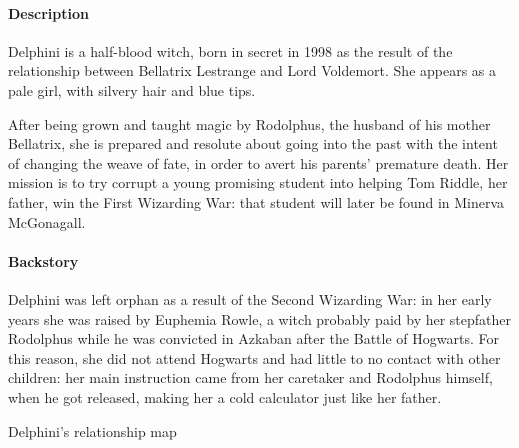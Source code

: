 
\paragraph{Description}
Delphini is a half-blood witch, born in secret in 1998 as the result of the relationship between Bellatrix Lestrange and Lord Voldemort. She appears as a pale girl, with silvery hair and blue tips.

After being grown and taught magic by Rodolphus, the husband of his mother Bellatrix, she is prepared and resolute about going into the past with the intent of changing the weave of fate, in order to avert his parents' premature death. Her mission is to try corrupt a young promising student into helping Tom Riddle, her father, win the First Wizarding War: that student will later be found in Minerva McGonagall. 

\paragraph{Backstory}
Delphini was left orphan as a result of the Second Wizarding War: in her early years she was raised by Euphemia Rowle, a witch probably paid by her stepfather Rodolphus while he was convicted in Azkaban after the Battle of Hogwarts. For this reason, she did not attend Hogwarts and had little to no contact with other children: her main instruction came from her caretaker and Rodolphus himself, when he got released, making her a cold calculator just like her father.
\pagebreak 

\pagebreak

 {Delphini's relationship map}
\pagebreak



\pagebreak
{}
\clearpage
